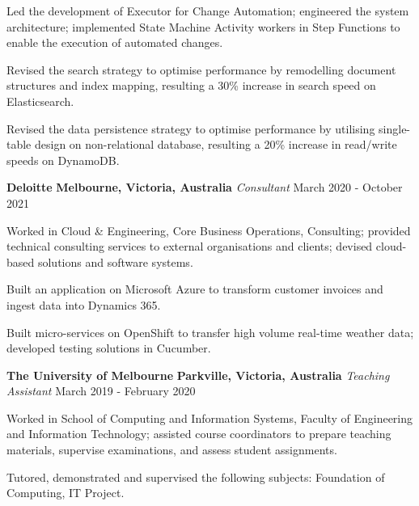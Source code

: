 \documentclass{cv}
\begin{document}
\begin{list}{}{\setlength{\leftmargin}{0pt}}
\begin{list}{\raisebox{2.0pt}{\tiny$\bullet$}\space}{\setlength{\leftmargin}{11.2pt}}
        \item Led the development of Executor for Change Automation; engineered the system architecture; implemented State Machine Activity workers in Step Functions to enable the execution of automated changes.
        \item Revised the search strategy to optimise performance by remodelling document structures and index mapping, resulting a 30\% increase in search speed on Elasticsearch.
        \item Revised the data persistence strategy to optimise performance by utilising single-table design on non-relational database, resulting a 20\% increase in read/write speeds on DynamoDB.
    \end{list}
\item
    \textbf{Deloitte} \hfill \textbf{Melbourne, Victoria, Australia}%
    \vspace{1.0pt} \newline 
    {\textit{Consultant}} \hfill {March 2020 - October 2021}%
    \begin{list}{\raisebox{2.0pt}{\tiny$\bullet$}\space}{\setlength{\leftmargin}{11.2pt}}
        \itemsep -4.0pt \vspace{-4.0pt}
        \item Worked in Cloud \& Engineering, Core Business Operations, Consulting; provided technical consulting services to external organisations and clients; devised cloud-based solutions and software systems.
        \item Built an application on Microsoft Azure to transform customer invoices and ingest data into Dynamics 365.
        \item Built micro-services on OpenShift to transfer high volume real-time weather data; developed testing solutions in Cucumber.
    \end{list}
\item
    \textbf{The University of Melbourne} \hfill \textbf{Parkville, Victoria, Australia}%
    \vspace{1.0pt} \newline 
    {\textit{Teaching Assistant}} \hfill {March 2019 - February 2020}%
    \begin{list}{\raisebox{2.0pt}{\tiny$\bullet$}\space}{\setlength{\leftmargin}{11.2pt}}
        \itemsep -4.0pt \vspace{-4.0pt}
        \item Worked in School of Computing and Information Systems, Faculty of Engineering and Information Technology; assisted course coordinators to prepare teaching materials, supervise examinations, and assess student assignments.
        \item Tutored, demonstrated and supervised the following subjects: Foundation of Computing, IT Project.
    \end{list}
\end{list}

\end{document}
